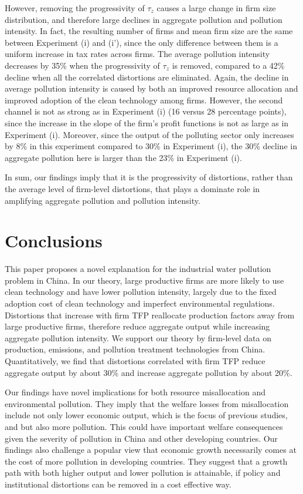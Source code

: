 \documentclass[AEJ]{AEA}
\begin{document}
However, removing the progressivity of $\tau_z$ causes a large change in firm size distribution, and therefore large declines in aggregate pollution and pollution intensity. In fact, the resulting number of firms and mean firm size are the same between Experiment (i) and (i'), since the only difference between them is a uniform increase in tax rates across firms. The average pollution intensity decreases by 35\% when the progressivity of $\tau_z$ is removed, compared to a 42\% decline when all the correlated distortions are eliminated. Again, the decline in average pollution intensity is caused by both an improved resource allocation and improved adoption of the clean technology among firms. However, the second channel is not as strong as in Experiment (i) (16 versus 28 percentage points), since the increase in the slope of the firm's profit functions is not as large as in Experiment (i). Moreover, since the output of the polluting sector only increases by 8\% in this experiment compared to 30\% in Experiment (i), the 30\% decline in aggregate pollution here is larger than the 23\% in Experiment (i).

In sum, our findings imply that it is the progressivity of distortions, rather than the average level of firm-level distortions, that plays a dominate role in amplifying aggregate pollution and pollution intensity.

\section{Conclusions}

This paper proposes a novel explanation for the industrial water pollution problem in China. In our theory, large productive firms are more likely to use clean technology and have lower pollution intensity, largely due to the fixed adoption cost of clean technology and imperfect environmental regulations. Distortions that increase with firm TFP reallocate production factors away from large productive firms, therefore reduce aggregate output while increasing aggregate pollution intensity. We support our theory by firm-level data on production, emissions, and pollution treatment technologies from China. Quantitatively, we find that distortions correlated with firm TFP reduce aggregate output by about 30\% and increase aggregate pollution by about 20\%.

Our findings have novel implications for both resource misallocation and environmental pollution. They imply that the welfare losses from misallocation include not only lower economic output, which is the focus of previous studies, and but also more pollution. This could have important welfare consequences given the severity of pollution in China and other developing countries. Our findings also challenge a popular view that economic growth necessarily comes at the cost of more pollution in developing countries. They suggest that a growth path with both higher output and lower pollution is attainable, if policy and institutional distortions can be removed in a cost effective way.
\end{document}
